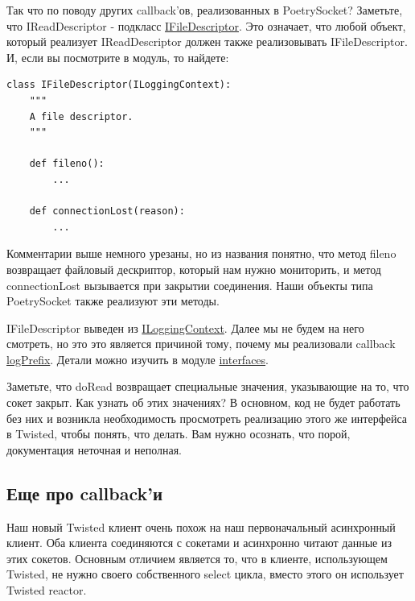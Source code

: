 Так что по поводу других callback'ов, реализованных в PoetrySocket? 
Заметьте, что IReadDescriptor - подкласс 
\href{http://twistedmatrix.com/trac/browser/tags/releases/twisted-8.2.0/twisted/internet/interfaces.py#L918}{IFileDescriptor}. Это означает, что любой объект, который реализует 
IReadDescriptor должен также реализовывать IFileDescriptor. 
И, если вы посмотрите в модуль, то найдете:

\begin{scriptsize}\begin{verbatim}
class IFileDescriptor(ILoggingContext):
    """
    A file descriptor.
    """

    def fileno():
        ...

    def connectionLost(reason):
        ...
\end{verbatim}\end{scriptsize}

Комментарии выше немного урезаны, но из названия понятно, что 
метод fileno возвращает файловый дескриптор, который нам 
нужно мониторить, и метод connectionLost вызывается при 
закрытии соединения. Наши объекты типа PoetrySocket также реализуют 
эти методы.


IFileDescriptor выведен из \href{http://twistedmatrix.com/trac/browser/tags/releases/twisted-8.2.0/twisted/internet/interfaces.py#L905}{ILoggingContext}. Далее мы не будем на 
него смотреть, но это это является причиной тому, почему мы реализовали 
callback 
\href{http://github.com/jdavisp3/twisted-intro/blob/master/twisted-client-1/get-poetry.py#L110}{logPrefix}. Детали можно изучить в модуле 
\href{http://twistedmatrix.com/trac/browser/tags/releases/twisted-8.2.0/twisted/internet/interfaces.py}{interfaces}.


Заметьте, что doRead возвращает специальные значения, 
указывающие на то, что сокет закрыт. Как узнать об этих 
значениях? В основном, код не будет работать без них и 
возникла необходимость просмотреть реализацию этого же интерфейса в 
Twisted, чтобы понять, что делать. Вам нужно осознать, что 
порой, документация неточная и неполная. 


\subsection{Еще про callback'и}

Наш новый Twisted клиент очень похож на наш первоначальный 
асинхронный клиент. Оба клиента соединяются с сокетами и 
асинхронно читают данные из этих сокетов. Основным отличием является то, что 
в клиенте, использующем Twisted, не нужно своего собственного 
select цикла, вместо этого он использует Twisted reactor.  


